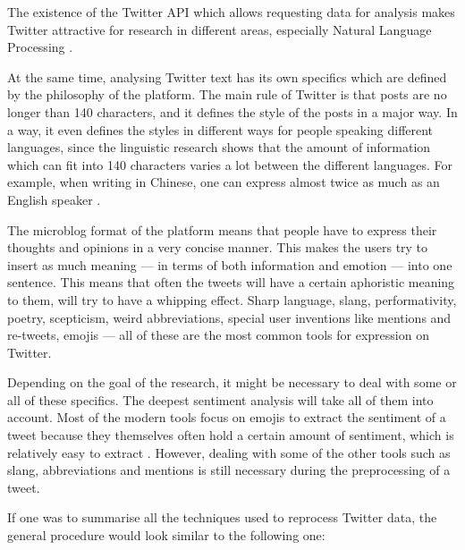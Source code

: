 The existence of the Twitter API which allows requesting data for analysis makes Twitter attractive for research in different areas, especially Natural Language Processing \cite{twitterapi}. 

At the same time, analysing Twitter text has its own specifics which are defined by the philosophy of the platform. The main rule of Twitter is that posts are no longer than 140 characters, and it defines the style of the posts in a major way. In a way, it even defines the styles in different ways for people speaking different languages, since the linguistic research shows that the amount of information which can fit into 140 characters varies a lot between the different languages. For example, when writing in Chinese, one can express almost twice as much as an English speaker \cite{neubig2013much}. 

The microblog format of the platform means that people have to express their thoughts and opinions in a very concise manner. This makes the users try to insert as much meaning --- in terms of both information and emotion --- into one sentence. This means that often the tweets will have a certain aphoristic meaning to them, will try to have a whipping effect. Sharp language, slang, performativity, poetry, scepticism, weird abbreviations, special user inventions like mentions and re-tweets, emojis --- all of these are the most common tools for expression on Twitter. 

Depending on the goal of the research, it might be necessary to deal with some or all of these specifics. The deepest sentiment analysis will take all of them into account. Most of the modern tools focus on emojis to extract the sentiment of a tweet because they themselves often hold a certain amount of sentiment, which is relatively easy to extract \cite{novak2015sentiment}. However, dealing with some of the other tools such as slang, abbreviations and mentions is still necessary during the preprocessing of a tweet.

If one was to summarise all the techniques used to reprocess Twitter data, the general procedure would look similar to the following one:

